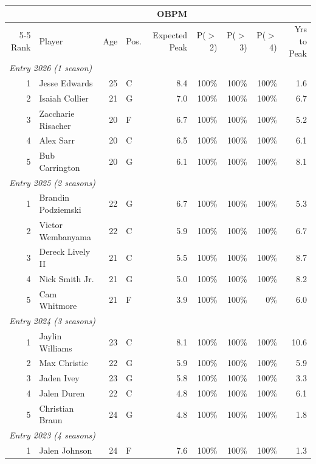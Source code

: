 \begin{table}[htbp]
  \centering\small
  \begin{tabular}{rlrlrrrrr}
    \toprule
     & & & & OBPM & & & & \\
    \cmidrule(lr){5-5}
    Rank & Player & Age & Pos. & Expected Peak & P($>$2) & P($>$3) & P($>$4) & Yrs to Peak \\
    \midrule
    \multicolumn{9}{l}{\textit{Entry 2026 (1 season)}} \\
    \midrule
    1 & Jesse Edwards & 25 & C & 8.4 & 100\% & 100\% & 100\% & 1.6 \\
    2 & Isaiah Collier & 21 & G & 7.0 & 100\% & 100\% & 100\% & 6.7 \\
    3 & Zaccharie Risacher & 20 & F & 6.7 & 100\% & 100\% & 100\% & 5.2 \\
    4 & Alex Sarr & 20 & C & 6.5 & 100\% & 100\% & 100\% & 6.1 \\
    5 & Bub Carrington & 20 & G & 6.1 & 100\% & 100\% & 100\% & 8.1 \\
    \midrule[0.4pt]
    \multicolumn{9}{l}{\textit{Entry 2025 (2 seasons)}} \\
    \midrule
    1 & Brandin Podziemski & 22 & G & 6.7 & 100\% & 100\% & 100\% & 5.3 \\
    2 & Victor Wembanyama & 22 & C & 5.9 & 100\% & 100\% & 100\% & 6.7 \\
    3 & Dereck Lively II & 21 & C & 5.5 & 100\% & 100\% & 100\% & 8.7 \\
    4 & Nick Smith Jr. & 21 & G & 5.0 & 100\% & 100\% & 100\% & 8.2 \\
    5 & Cam Whitmore & 21 & F & 3.9 & 100\% & 100\% & 0\% & 6.0 \\
    \midrule[0.4pt]
    \multicolumn{9}{l}{\textit{Entry 2024 (3 seasons)}} \\
    \midrule
    1 & Jaylin Williams & 23 & C & 8.1 & 100\% & 100\% & 100\% & 10.6 \\
    2 & Max Christie & 22 & G & 5.9 & 100\% & 100\% & 100\% & 5.9 \\
    3 & Jaden Ivey & 23 & G & 5.8 & 100\% & 100\% & 100\% & 3.3 \\
    4 & Jalen Duren & 22 & C & 4.8 & 100\% & 100\% & 100\% & 6.1 \\
    5 & Christian Braun & 24 & G & 4.8 & 100\% & 100\% & 100\% & 1.8 \\
    \midrule[0.4pt]
    \multicolumn{9}{l}{\textit{Entry 2023 (4 seasons)}} \\
    \midrule
    1 & Jalen Johnson & 24 & F & 7.6 & 100\% & 100\% & 100\% & 1.3 \\

\end{tabular}
\end{table}
